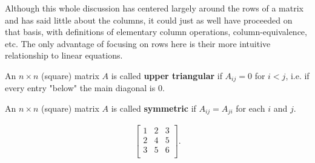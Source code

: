 \documentclass[12pt]{article}
\begin{document}
\begin{comm}
  Although this whole discussion has centered largely around the
  rows of a matrix and has said little about the columns, it
  could just as well have proceeded on that basis, with
  definitions of elementary column operations,
  column-equivalence, etc. The only advantage of focusing on rows
  here is their more intuitive relationship to linear equations.
\end{comm}

\begin{defn}
  An $n \times n$ (square) matrix $A$ is called \textbf{upper
  triangular} if $A_{ij} = 0$ for $i < j$, i.e. if every entry
  "below" the main diagonal is $0$.
\end{defn}

\begin{defn}
  An $n \times n$ (square) matrix $A$ is called \textbf{symmetric} if $A_{ij} =
  A_{ji}$ for each $i$ and $j$.

  \begin{exm}
    \begin{align*}
      \begin{bmatrix}
        1 & 2 & 3\\
        2 & 4 & 5\\
        3 & 5 & 6\\
      \end{bmatrix}.
    \end{align*}
  \end{exm}
\end{defn}
\end{document}
